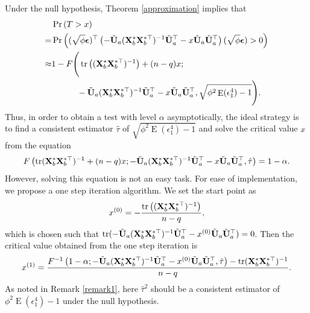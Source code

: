 \documentclass[smallextended]{svjour3}       %
\DeclareMathOperator{\mytr}{tr}
\DeclareMathOperator{\myE}{E}
\begin{document}
Under the null hypothesis, Theorem \ref{approximation} implies that
\begin{equation*}
    \begin{split}
    &\Pr\left( 
        T> x 
    \right) 
    \\
    =&
    \Pr\left( 
        (\sqrt \phi \bepsilon)^\top 
        \left( 
        -\tilde{\BU}_a ( \BX_b^* \BX_b^{*\top} )^{-1} \tilde{\BU}_a^\top 
   -x\tilde{\BU}_a \tilde{\BU}_a^\top
        \right)
        (\sqrt \phi \bepsilon)
        > 0
    \right) 
    \\
    \approx& 
    1- F\Bigg(
   \mytr\left( (\BX_b^* \BX_b^{*\top})^{-1} \right)
   +(n-q)x
        ;
        \\
        &\quad\quad\quad
        -\tilde{\BU}_a ( \BX_b^* \BX_b^{*\top} )^{-1} \tilde{\BU}_a^\top 
   -x\tilde{\BU}_a \tilde{\BU}_a^\top
,\sqrt{\phi^2 \myE (\epsilon_1^4) -1}\Bigg)
.
    \end{split}
\end{equation*}
Thus, in order to obtain a test with level $\alpha$ asymptotically, the ideal strategy is to find a consistent estimator $\hat \tau$ of $\sqrt{\phi^2 \myE (\epsilon_1^4) -1}$ and solve the critical value $x$ from the equation
\begin{equation*}
     F\left(
   \mytr (\BX_b^* \BX_b^{*\top})^{-1} 
   +(n-q)x
        ;-\tilde{\BU}_a ( \BX_b^* \BX_b^{*\top} )^{-1} \tilde{\BU}_a^\top 
   -x\tilde{\BU}_a \tilde{\BU}_a^\top
,\hat \tau\right)
=1-\alpha.
\end{equation*}
However, solving this equation is not an easy task.
For ease of implementation, we propose a one step iteration algorithm.
We set the start point as
\begin{equation*}
    x^{(0)} =  -\frac{\mytr \left( ( \BX_b^* \BX_b^{*\top} )^{-1} \right)}{n-q},
\end{equation*}
which is chosen such that $\mytr( -\tilde{\BU}_a ( \BX_b^* \BX_b^{*\top} )^{-1} \tilde{\BU}_a^\top 
-x^{(0)}\tilde{\BU}_a \tilde{\BU}_a^\top )=0$.
Then the critical value obtained from the one step iteration is
\begin{equation*}
    x^{(1)}= 
        \frac{
            F^{-1}\left(1-\alpha;-\tilde{\BU}_a ( \BX_b^* \BX_b^{*\top} )^{-1} \tilde{\BU}_a^\top 
                -x^{(0)}\tilde{\BU}_a \tilde{\BU}_a^\top
,\hat \tau\right)
-
   \mytr (\BX_b^* \BX_b^{*\top})^{-1} 
   }{n-q}
.
\end{equation*}
As noted in Remark \ref{remark1}, here $\hat \tau^2$ should be a consistent estimator of $\phi^2 \myE (\epsilon_1^4)-1$ under the null hypothesis.
\end{document}
